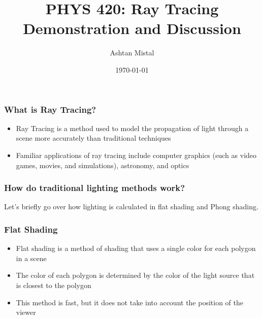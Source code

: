 \documentclass{beamer}
\title{PHYS 420: Ray Tracing Demonstration and Discussion}
\author{Ashtan Mistal}
\institute{University of British Columbia}
\date{\today}
\begin{document}
  \begin{frame}
    \titlepage
  \end{frame}


  \begin{frame}
    \frametitle{What is Ray Tracing?}
    \begin{itemize}
      \item Ray Tracing is a method used to model the propagation of light through a scene more accurately than traditional techniques
      \item Familiar applications of ray tracing include computer graphics (such as video games, movies, and simulations), astronomy, and optics
    \end{itemize}
  \end{frame}



  \begin{frame}
    \frametitle{How do traditional lighting methods work?}

    Let's briefly go over how lighting is calculated in flat shading and Phong shading.

  \end{frame}


  \begin{frame}
    \frametitle{Flat Shading}
    \begin{itemize}
      \item Flat shading is a method of shading that uses a single color for each polygon in a scene
      \item The color of each polygon is determined by the color of the light source that is closest to the polygon
      \item This method is fast, but it does not take into account the position of the viewer
    \end{itemize}
  \end{frame}
\end{document}

